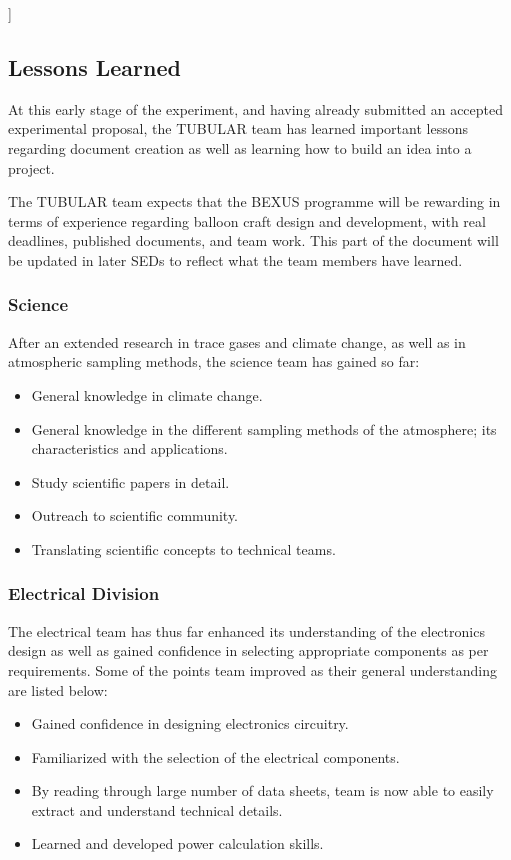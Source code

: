 ]\documentclass[a4paper,12pt,twoside]{article}
\begin{document}
 
\pagebreak
\subsection{Lessons Learned}
At this early stage of the experiment, and having already submitted an accepted experimental proposal, the TUBULAR team has learned important lessons regarding document creation as well as learning how to build an idea into a project. \par
The TUBULAR team expects that the BEXUS programme will be rewarding in terms of experience regarding balloon craft design and development, with real deadlines, published documents, and team work. This part of the document will be updated in later SEDs to reflect what the team members have learned.

\subsubsection{Science}
After an extended research in trace gases and climate change, as well as in atmospheric sampling methods, the science team has gained so far: 
\begin{itemize}
    \item General knowledge in climate change.
    \item General knowledge in the different sampling methods of the atmosphere; its characteristics and applications.
    \item Study scientific papers in detail.
    \item Outreach to scientific community.
    \item Translating scientific concepts to technical teams.
\end{itemize}


\subsubsection{Electrical Division}
The electrical team has thus far enhanced its understanding of the electronics design as well as gained confidence in selecting appropriate components as per requirements. Some of the points team improved as their general understanding are listed below:  
\begin{itemize}

    \item Gained confidence in designing electronics circuitry.
    \item Familiarized with the selection of the electrical components. 
    \item By reading through large number of data sheets, team is now able to easily extract and understand technical details. 
    \item Learned and developed power calculation skills.
\end{itemize}
\end{document}
